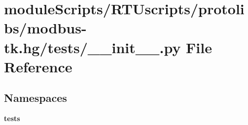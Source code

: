 \section{module\+Scripts/\+R\+T\+Uscripts/protolibs/modbus-\/tk.hg/tests/\+\_\+\+\_\+init\+\_\+\+\_\+.py File Reference}
\label{protolibs_2modbus-tk_8hg_2tests_2____init_____8py}
\subsection*{Namespaces}
\begin{DoxyCompactItemize}
\item 
 {\bf tests}
\end{DoxyCompactItemize}
